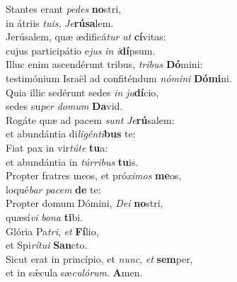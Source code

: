 \evenverse Stantes erant \textit{pe}\textit{des} \textbf{no}stri,~\*\\
\evenverse in átriis \textit{tu}\textit{is}, \textit{Je}\textbf{rú}\textbf{sa}lem.\\
\oddverse Jerúsalem, quæ ædificá\textit{tur} \textit{ut} \textbf{cí}vitas:~\*\\
\oddverse cujus participátio e\textit{jus} \textit{in} \textit{i}\textbf{dí}psum.\\
\evenverse Illuc enim ascendérunt tribus, \textit{tri}\textit{bus} \textbf{Dó}mini:~\*\\
\evenverse testimónium Israël ad confiténdum \textit{nó}\textit{mi}\textit{ni} \textbf{Dó}\textbf{mi}ni.\\
\oddverse Quia illic sedérunt sedes \textit{in} \textit{ju}\textbf{dí}cio,~\*\\
\oddverse sedes su\textit{per} \textit{do}\textit{mum} \textbf{Da}vid.\\
\evenverse Rogáte quæ ad pacem \textit{sunt} \textit{Je}\textbf{rú}salem:~\*\\
\evenverse et abundántia di\textit{li}\textit{gén}\textit{ti}\textbf{bus} te:\\
\oddverse Fiat pax in vir\textit{tú}\textit{te} \textbf{tu}a:~\*\\
\oddverse et abundántia in \textit{túr}\textit{ri}\textit{bus} \textbf{tu}is.\\
\evenverse Propter fratres meos, et pró\textit{xi}\textit{mos} \textbf{me}os,~\*\\
\evenverse loqué\textit{bar} \textit{pa}\textit{cem} \textbf{de} te:\\
\oddverse Propter domum Dómini, \textit{De}\textit{i} \textbf{no}stri,~\*\\
\oddverse quæsí\textit{vi} \textit{bo}\textit{na} \textbf{ti}bi.\\
\evenverse Glória Pa\textit{tri}, \textit{et} \textbf{Fí}lio,~\*\\
\evenverse et Spi\textit{rí}\textit{tu}\textit{i} \textbf{San}cto.\\
\oddverse Sicut erat in princípio, et \textit{nunc}, \textit{et} \textbf{sem}per,~\*\\
\oddverse et in sǽcula sæ\textit{cu}\textit{ló}\textit{rum}. \textbf{A}men.\\

